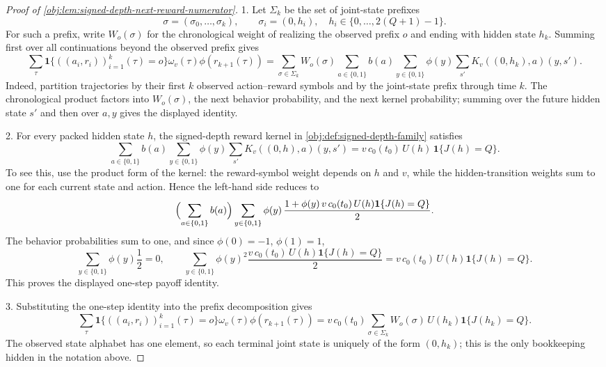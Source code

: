 \documentclass[11pt]{article}
\begin{document}
\begin{proof}[Proof of \cref{obj:lem:signed-depth-next-reward-numerator}]
1.  Let \(\Sigma_k\) be the set of joint-state prefixes
\[
\sigma=(\sigma_0,\ldots,\sigma_k),
\qquad
\sigma_i=(0,h_i),\quad h_i\in\{0,\ldots,2(Q+1)-1\}.
\]
For such a prefix, write \(W_o(\sigma)\) for the chronological weight of realizing the observed prefix \(o\) and ending with hidden state \(h_k\).  Summing first over all continuations beyond the observed prefix gives
\[
\sum_{\tau}
\mathbf 1\{((a_i,r_i))_{i=1}^k(\tau)=o\}
\omega_v(\tau)\phi(r_{k+1}(\tau))
=
\sum_{\sigma\in\Sigma_k}
W_o(\sigma)
\sum_{a\in\{0,1\}} b(a)
\sum_{y\in\{0,1\}}\phi(y)
\sum_{s'} K_v((0,h_k),a)(y,s').
\]
Indeed, partition trajectories by their first \(k\) observed action--reward symbols and by the joint-state prefix through time \(k\).  The chronological product factors into \(W_o(\sigma)\), the next behavior probability, and the next kernel probability; summing over the future hidden state \(s'\) and then over \(a,y\) gives the displayed identity. %

2.  For every packed hidden state \(h\), the signed-depth reward kernel in \cref{obj:def:signed-depth-family} satisfies
\[
\sum_{a\in\{0,1\}} b(a)
\sum_{y\in\{0,1\}}\phi(y)
\sum_{s'}K_v((0,h),a)(y,s')
=
v\,c_0(t_0)\,U(h)\,\mathbf 1\{J(h)=Q\}.
\]
To see this, use the product form of the kernel: the reward-symbol weight depends on \(h\) and \(v\), while the hidden-transition weights sum to one for each current state and action.  Hence the left-hand side reduces to
\[
\Bigl(\sum_{a\in\{0,1\}} b(a)\Bigr)
\sum_{y\in\{0,1\}}\phi(y)\,
\frac{1+\phi(y)\,v\,c_0(t_0)\,U(h)\mathbf 1\{J(h)=Q\}}{2}.
\]
The behavior probabilities sum to one, and since \(\phi(0)=-1\), \(\phi(1)=1\),
\[
\sum_{y\in\{0,1\}}\phi(y)\frac{1}{2}=0,
\qquad
\sum_{y\in\{0,1\}}\phi(y)^2\frac{v\,c_0(t_0)\,U(h)\mathbf 1\{J(h)=Q\}}{2}
=
v\,c_0(t_0)\,U(h)\mathbf 1\{J(h)=Q\}.
\]
This proves the displayed one-step payoff identity. %

3.  Substituting the one-step identity into the prefix decomposition gives
\[
\sum_{\tau}
\mathbf 1\{((a_i,r_i))_{i=1}^k(\tau)=o\}
\omega_v(\tau)\phi(r_{k+1}(\tau))
=
v\,c_0(t_0)
\sum_{\sigma\in\Sigma_k}
W_o(\sigma)\,U(h_k)\mathbf 1\{J(h_k)=Q\}.
\]
The observed state alphabet has one element, so each terminal joint state is uniquely of the form \((0,h_k)\); this is the only bookkeeping hidden in the notation above. %


\end{proof}
\end{document}
